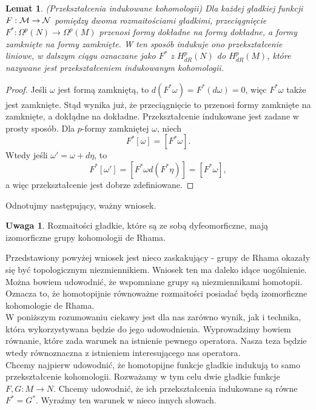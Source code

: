 \documentclass[licencjacka]{pracamgr}
\theoremstyle{definition}
\theoremstyle{definition}
\newtheorem{remark}{Uwaga}[section]
\theoremstyle{plain}
\newtheorem{lemma}{Lemat}[section]
\theoremstyle{plain}
\def\M{\ensuremath\mathcal{M}}
\begin{document}
\begin{lemma}(Przekształcenia indukowane kohomologii)
  Dla każdej gładkiej funkcji $F: \M \rightarrow \mathcal{N}$ pomiędzy
  dwoma rozmaitościami gładkimi, przeciągnięcie 
  $F^\ast: \Omega^p(N) \rightarrow \Omega^p (M)$ przenosi formy dokładne
  na formy dokładne, a formy zamknięte na formy zamknięte. W ten sposób indukuje
  ono przekształcenie liniowe, w dalszym ciągu oznaczane jako $F^\ast$ z
  $H^p_{dR} (N)$ do $H^p_{dR} (M)$, które nazywane jest przekształceniem indukowanym
  kohomologii. \\
\end{lemma}
\begin{proof}
  Jeśli $\omega$ jest formą zamkniętą, to $d(F^\ast \omega) = F^\ast(d \omega) = 0$,
  więc $F^\ast \omega$ także jest zamknięte. Stąd wynika już, że przeciągnięcie
  to przenosi formy zamknięte na zamknięte, a dokłądne na dokładne. Przekształcenie
  indukowane jest zadane w prosty sposób. Dla $p$-formy zamkniętej $\omega$, niech
  \[
  F^\ast[\omega] = [F^\ast\omega].
  \]
  Wtedy jeśli $\omega' = \omega + d \eta$, to 
  \[
  F^\ast[\omega'] = [F^\ast\omega d(F^\ast\eta)] = [F^\ast\omega],
  \]
  a więc przekształcenie jest dobrze zdefiniowane.
\end{proof} 
Odnotujmy następujący, ważny wniosek.

\begin{remark}
  Rozmaitości gładkie, które są ze sobą dyfeomorficzne, mają izomorficzne grupy
  kohomologii de Rhama. \\
\end{remark}



Przedstawiony powyżej wniosek jest nieco zaskakujący - grupy de Rhama okazały
się być topologicznym niezmiennikiem. Wniosek ten ma daleko idące uogólnienie.
Można bowiem udowodnić, że wspomniane grupy są niezmiennikami homotopii. Oznacza
to, że homotopijnie równoważne rozmaitości posiadać będą izomorficzne kohomologie
de Rhama. \\

W poniższym rozumowaniu ciekawy jest dla nas zarówno wynik, jak i technika, która
wykorzystywana będzie do jego udowodnienia. Wyprowadzimy bowiem równanie, które
zada warunek na istnienie pewnego operatora. Nasza teza będzie wtedy równoznaczna
z istnieniem interesującego nas operatora. \\

Chcemy najpierw udowodnić, że homotopijne funkcje gładkie indukują to samo 
przekształcenie kohomologii.
Rozważamy w tym celu dwie gładkie funkcje $F, G: M \rightarrow N$.
Chcemy udowodnić, że ich przekształcenia indukowane są równe
$F^\ast = G^\ast$. Wyraźmy ten warunek w nieco innych słowach. \\
\end{document}
